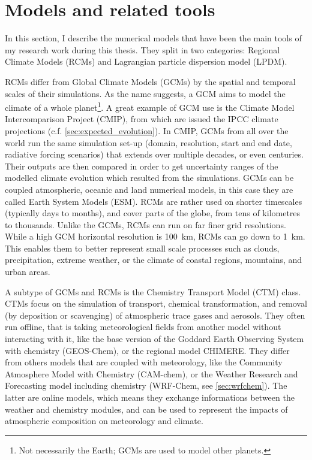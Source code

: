 \section{Models and related tools}
In this section, I describe the numerical models that have been the main tools of my research work during this thesis.
They split in two categories: Regional Climate Models (RCMs) and Lagrangian particle dispersion model (LPDM). 

RCMs differ from Global Climate Models (GCMs) by the spatial and temporal scales of their simulations. As the name suggests, a GCM aims to model the climate of a whole planet\footnote{Not necessarily the Earth; GCMs are used to model other planets.}. A great example of GCM use is the Climate Model Intercomparison Project (CMIP), from which are issued the IPCC climate projections (c.f. \cref{sec:expected_evolution}). In CMIP, GCMs from all over the world run the same simulation set-up (domain, resolution, start and end date, radiative forcing scenarios) that extends over multiple decades, or even centuries. Their outputs are then compared in order to get uncertainty ranges of the modelled climate evolution which resulted from the simulations.
GCMs can be coupled atmospheric, oceanic and land numerical models, in this case they are called Earth System Models (ESM).
RCMs are rather used on shorter timescales (typically days to months), and cover parts of the globe, from tens of kilometres to thousands. Unlike the GCMs, RCMs can run on far finer grid resolutions. While a high GCM horizontal resolution is \SI{100}{km}, RCMs can go down to \SI{1}{km}. This enables them to better represent small scale processes such as clouds, precipitation, extreme weather, or the climate of coastal regions, mountains, and urban areas.

A subtype of GCMs and RCMs is the Chemistry Transport Model (CTM) class. CTMs focus on the simulation of transport, chemical transformation, and removal (by deposition or scavenging) of atmospheric trace gases and aerosols. They often run offline, that is taking meteorological fields from another model without interacting with it, like the base version of the Goddard Earth Observing System with chemistry (GEOS-Chem), or the regional model CHIMERE. %
They differ from others models that are coupled with meteorology, like the Community Atmosphere Model with Chemistry (CAM-chem), or the Weather Research and Forecasting model including chemistry (WRF-Chem, see \cref{sec:wrfchem}).
The latter are online models, which means they exchange informations between the weather and chemistry modules, and can be used to represent the impacts of atmospheric composition on meteorology and climate.

